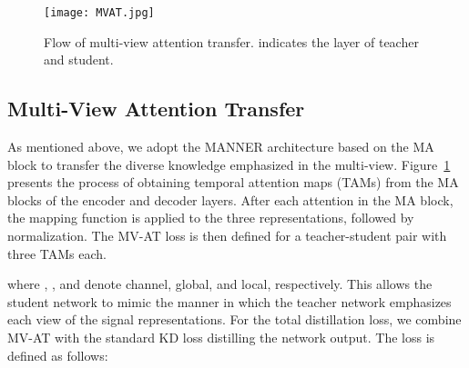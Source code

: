 \documentclass[a4paper]{article}
\begin{document}
\begin{figure}[t]
  \centering
  \texttt{[image: MVAT.jpg]}
  \caption{Flow of multi-view attention transfer.  indicates the layer of teacher and student.}
  \label{fig:MVAT}
\end{figure}
\subsection{Multi-View Attention Transfer}
As mentioned above, we adopt the MANNER architecture based on the MA block to transfer the diverse knowledge emphasized in the multi-view. Figure~\ref{fig:MVAT} presents the process of obtaining temporal attention maps (TAMs) from the MA blocks of the encoder and decoder layers. After each attention in the MA block, the mapping function  is applied to the three representations, followed by normalization. The MV-AT loss is then defined for a teacher-student pair with three TAMs each.

where , , and  denote channel, global, and local, respectively. This allows the student network to mimic the manner in which the teacher network emphasizes each view of the signal representations. For the total distillation loss, we combine MV-AT with the standard KD loss distilling the network output. The loss is defined as follows:
\end{document}
